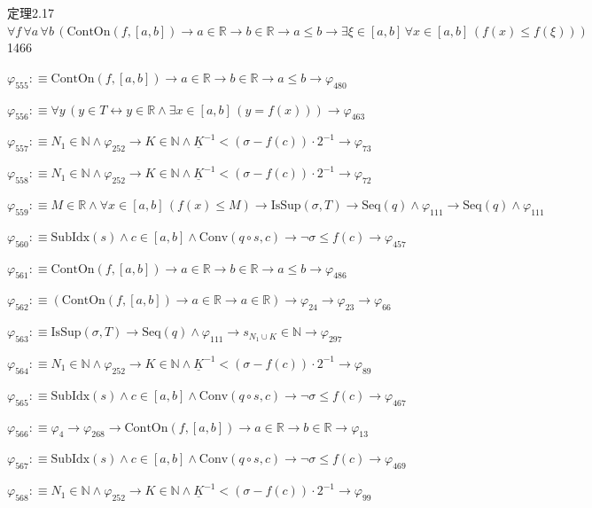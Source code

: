 \begin{fullproof}{定理2.17}{$\forall f\,\forall a\,\forall b\,(\mathrm{ContOn}(f,[a,b]) \to a \in \mathbb{R} \to b \in \mathbb{R} \to a \leq b \to \exists \xi \in [a,b]\,\forall x \in [a,b]\,(f(x) \leq f(\xi)))$}{1466}
\begin{abbrevlist}
\item $\varphi_{555} :\equiv \mathrm{ContOn}(f,[a,b]) \to a \in \mathbb{R} \to b \in \mathbb{R} \to a \leq b \to \varphi_{480}$
\item $\varphi_{556} :\equiv \forall y\,(y \in T \leftrightarrow y \in \mathbb{R} \land \exists x \in [a,b]\,(y = f(x))) \to \varphi_{463}$
\item $\varphi_{557} :\equiv N_{1} \in \mathbb{N} \land \varphi_{252} \to K \in \mathbb{N} \land \underline{K}^{-1} < (\sigma - f(c)) \cdot 2^{-1} \to \varphi_{73}$
\item $\varphi_{558} :\equiv N_{1} \in \mathbb{N} \land \varphi_{252} \to K \in \mathbb{N} \land \underline{K}^{-1} < (\sigma - f(c)) \cdot 2^{-1} \to \varphi_{72}$
\item $\varphi_{559} :\equiv M \in \mathbb{R} \land \forall x \in [a,b]\,(f(x) \leq M) \to \mathrm{IsSup}(\sigma,T) \to \mathrm{Seq}(q) \land \varphi_{111} \to \mathrm{Seq}(q) \land \varphi_{111}$
\item $\varphi_{560} :\equiv \mathrm{SubIdx}(s) \land c \in [a,b] \land \mathrm{Conv}(q \circ s,c) \to \neg \sigma \leq f(c) \to \varphi_{457}$
\item $\varphi_{561} :\equiv \mathrm{ContOn}(f,[a,b]) \to a \in \mathbb{R} \to b \in \mathbb{R} \to a \leq b \to \varphi_{486}$
\item $\varphi_{562} :\equiv (\mathrm{ContOn}(f,[a,b]) \to a \in \mathbb{R} \to a \in \mathbb{R}) \to \varphi_{24} \to \varphi_{23} \to \varphi_{66}$
\item $\varphi_{563} :\equiv \mathrm{IsSup}(\sigma,T) \to \mathrm{Seq}(q) \land \varphi_{111} \to s_{N_{1} \cup K} \in \mathbb{N} \to \varphi_{297}$
\item $\varphi_{564} :\equiv N_{1} \in \mathbb{N} \land \varphi_{252} \to K \in \mathbb{N} \land \underline{K}^{-1} < (\sigma - f(c)) \cdot 2^{-1} \to \varphi_{89}$
\item $\varphi_{565} :\equiv \mathrm{SubIdx}(s) \land c \in [a,b] \land \mathrm{Conv}(q \circ s,c) \to \neg \sigma \leq f(c) \to \varphi_{467}$
\item $\varphi_{566} :\equiv \varphi_{4} \to \varphi_{268} \to \mathrm{ContOn}(f,[a,b]) \to a \in \mathbb{R} \to b \in \mathbb{R} \to \varphi_{13}$
\item $\varphi_{567} :\equiv \mathrm{SubIdx}(s) \land c \in [a,b] \land \mathrm{Conv}(q \circ s,c) \to \neg \sigma \leq f(c) \to \varphi_{469}$
\item $\varphi_{568} :\equiv N_{1} \in \mathbb{N} \land \varphi_{252} \to K \in \mathbb{N} \land \underline{K}^{-1} < (\sigma - f(c)) \cdot 2^{-1} \to \varphi_{99}$

\end{abbrevlist}
\end{fullproof}
